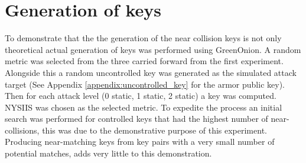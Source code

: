 \section{Generation of keys}
\label{sec:key_gen}
To demonstrate that the the generation of the near collision keys is not only theoretical actual generation of keys was performed using GreenOnion. A random metric was selected from the three carried forward from the first experiment. Alongside this a random uncontrolled key was generated as the simulated attack target (See Appendix \ref{appendix:uncontrolled_key} for the armor public key). Then for each attack level (0 static, 1 static, 2 static) a key was computed. NYSIIS was chosen as the selected metric. To expedite the process an initial search was performed for controlled keys that had the highest number of near-collisions, this was due to the demonstrative purpose of this experiment. Producing near-matching keys from key pairs with a very small number of potential matches, adds very little to this demonstration.

